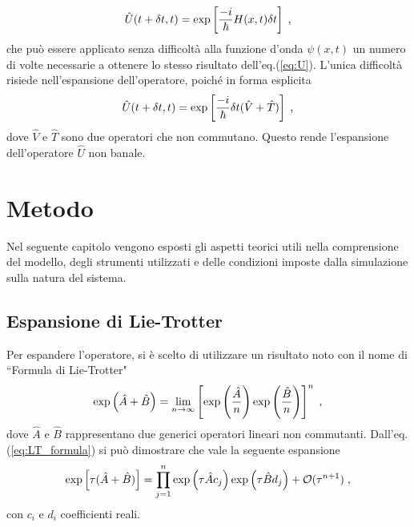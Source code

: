\documentclass[12pt]{report}
\begin{document}
\begin{equation}
    \centering
    \hat{U}(t + \delta t, t) = \exp \left[\frac{-i}{\hbar} {H}(x,t) \delta t \right]  \; \text{,}
    \label{eq:U_inf}
\end{equation}
che può essere applicato senza difficoltà alla funzione d'onda $\psi(x,t)$ un numero di volte necessarie a ottenere lo stesso risultato dell'eq.(\ref{eq:U}).
L'unica difficoltà risiede nell'espansione dell'operatore, poiché in forma esplicita  
\begin{equation}
    \centering
    \hat{U}(t + \delta t, t) =  \exp \left[\frac{-i}{\hbar} \delta t (\hat{V} + \hat{T}) \right] \; \text{,}
    \label{eq:U_esplicit} 
\end{equation}
dove $\hat{V}$ e $\hat{T}$ sono due operatori che non commutano. Questo rende l'espansione dell'operatore $\hat{U}$ non banale.

\clearpage

\chapter{Metodo}
\label{ch:teoria}

Nel seguente capitolo vengono esposti gli aspetti teorici utili nella comprensione del modello, degli strumenti utilizzati e delle condizioni imposte dalla simulazione sulla natura del sistema.

\section{Espansione di Lie-Trotter}
\label{sec:LT}

Per espandere l'operatore, si è scelto di utilizzare un risultato noto con il nome di ``Formula di Lie-Trotter"
\begin{equation}
    \centering
     \exp \left(\hat{A} + \hat{B}\right) = \lim_{n\to\infty } \left[  \exp \left(\frac{\hat{A}}{n}\right)  \exp \left(\frac{\hat{B}}{n}\right) \right] ^{n} \; \text{,}
    \label{eq:LT_formula}
\end{equation}
dove $\hat{A}$ e $\hat{B}$ rappresentano due generici operatori lineari non commutanti.
Dall'eq.(\ref{eq:LT_formula}) si può dimostrare che vale la seguente espansione 
\begin{equation}
    \centering
    \exp \left[\tau (\hat{A} + \hat{B})\right]
    = \prod _{j=1} ^{n}  \exp \left( \tau \hat{A} c_{j}\right)   \exp \left(\tau \hat{B} d_{j}\right) + \mathcal{O}(\tau^{n+1}) \; \text{,}
    \label{eq:LT_expantion}
\end{equation}
con $c_{i}$ e $d_{i}$ coefficienti reali.
\end{document}
